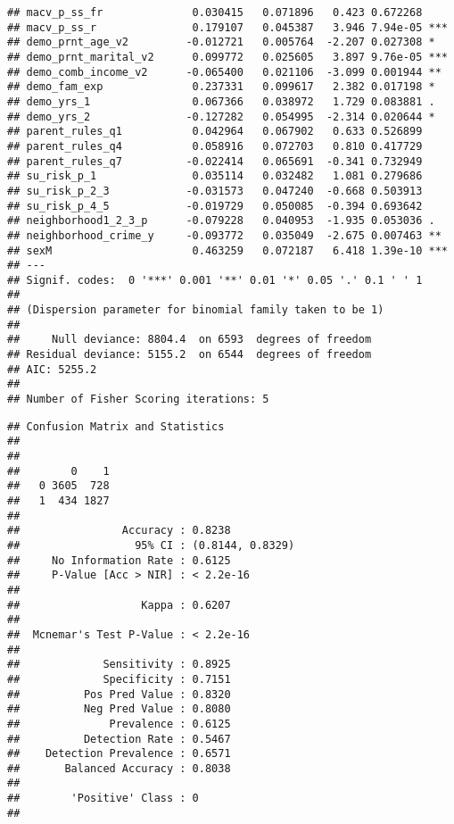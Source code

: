 \documentclass[
]{article}
\newenvironment{Shaded}{\begin{snugshade}}{\end{snugshade}}
\newcommand{\FloatTok}[1]{\textcolor[rgb]{0.00,0.00,0.81}{#1}}
\newcommand{\FunctionTok}[1]{\textcolor[rgb]{0.00,0.00,0.00}{#1}}
\newcommand{\NormalTok}[1]{#1}
\newcommand{\OtherTok}[1]{\textcolor[rgb]{0.56,0.35,0.01}{#1}}
\newcommand{\SpecialCharTok}[1]{\textcolor[rgb]{0.00,0.00,0.00}{#1}}
\begin{document}
\begin{verbatim}
## macv_p_ss_fr              0.030415   0.071896   0.423 0.672268    
## macv_p_ss_r               0.179107   0.045387   3.946 7.94e-05 ***
## demo_prnt_age_v2         -0.012721   0.005764  -2.207 0.027308 *  
## demo_prnt_marital_v2      0.099772   0.025605   3.897 9.76e-05 ***
## demo_comb_income_v2      -0.065400   0.021106  -3.099 0.001944 ** 
## demo_fam_exp              0.237331   0.099617   2.382 0.017198 *  
## demo_yrs_1                0.067366   0.038972   1.729 0.083881 .  
## demo_yrs_2               -0.127282   0.054995  -2.314 0.020644 *  
## parent_rules_q1           0.042964   0.067902   0.633 0.526899    
## parent_rules_q4           0.058916   0.072703   0.810 0.417729    
## parent_rules_q7          -0.022414   0.065691  -0.341 0.732949    
## su_risk_p_1               0.035114   0.032482   1.081 0.279686    
## su_risk_p_2_3            -0.031573   0.047240  -0.668 0.503913    
## su_risk_p_4_5            -0.019729   0.050085  -0.394 0.693642    
## neighborhood1_2_3_p      -0.079228   0.040953  -1.935 0.053036 .  
## neighborhood_crime_y     -0.093772   0.035049  -2.675 0.007463 ** 
## sexM                      0.463259   0.072187   6.418 1.39e-10 ***
## ---
## Signif. codes:  0 '***' 0.001 '**' 0.01 '*' 0.05 '.' 0.1 ' ' 1
## 
## (Dispersion parameter for binomial family taken to be 1)
## 
##     Null deviance: 8804.4  on 6593  degrees of freedom
## Residual deviance: 5155.2  on 6544  degrees of freedom
## AIC: 5255.2
## 
## Number of Fisher Scoring iterations: 5
\end{verbatim}

\begin{Shaded}
\end{Shaded}

\begin{verbatim}
## Confusion Matrix and Statistics
## 
##    
##        0    1
##   0 3605  728
##   1  434 1827
##                                           
##                Accuracy : 0.8238          
##                  95% CI : (0.8144, 0.8329)
##     No Information Rate : 0.6125          
##     P-Value [Acc > NIR] : < 2.2e-16       
##                                           
##                   Kappa : 0.6207          
##                                           
##  Mcnemar's Test P-Value : < 2.2e-16       
##                                           
##             Sensitivity : 0.8925          
##             Specificity : 0.7151          
##          Pos Pred Value : 0.8320          
##          Neg Pred Value : 0.8080          
##              Prevalence : 0.6125          
##          Detection Rate : 0.5467          
##    Detection Prevalence : 0.6571          
##       Balanced Accuracy : 0.8038          
##                                           
##        'Positive' Class : 0               
## 
\end{verbatim}
\end{document}
